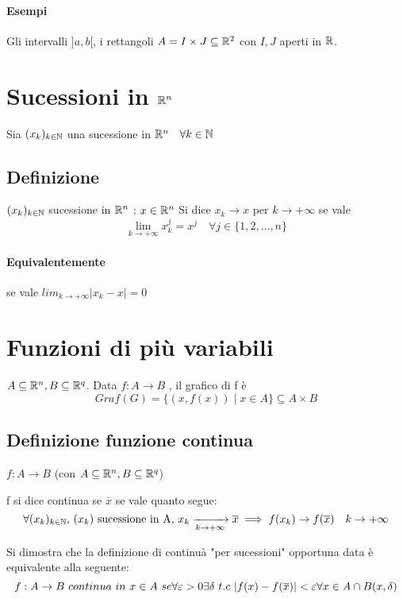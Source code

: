 \documentclass[a4paper]{article}
\begin{document}
\paragraph{Esempi} Gli intervalli $]a,b[$, i rettangoli $ A = I \times J \subseteq \mathbb{R} ^ 2 $ con $I,J$ aperti in $\mathbb{R}$. 

\section{ Sucessioni in $\mathbb{R} ^ n$}
Sia $ (x_k)_{k \in \mathbb{N}} $ una sucessione in $\mathbb{R} ^ n \quad \forall k \in \mathbb{N}$
\subsection {Definizione} 
$ (x_k)_{k \in \mathbb{N}} $ sucessione in $ \mathbb{R} ^ n$ ; $ x \in \mathbb{R} ^ n $
Si dice $ x_k \to x $ per $ k \to + \infty $ se vale 
$$
\lim_{k \to + \infty} x^j_k = x^j \quad \forall j \in \{ 1,2, \dots , n \}
$$
\paragraph {  Equivalentemente} se vale  $ lim_{k \to + \infty} | x_k -x | =0 $

\section{Funzioni di più variabili} 
$ A \subseteq \mathbb{R} ^ n, B \subseteq \mathbb{R} ^ q$. Data $ f: A \to B$ , il grafico di f è
$$
Graf(G)= \{ (x,f(x)) \mid x \in A \} \subseteq A \times B 
$$

\subsection { Definizione funzione continua} $f: A \to B$ (con $ A \subseteq \mathbb{R}^n , B \subseteq \mathbb{R} ^ q $)

f si dice continua se $ \overline x $ se vale quanto segue:
$$
\forall  (x_k)_{k \in \mathbb{N}} \mbox{, $(x_k)$ sucessione in A, } x_k \xrightarrow[k \to + \infty]{ } \overline x \\ 
\implies f( x_k ) \to f( \overline x ) \quad k \to + \infty
$$

Si dimostra che la definizione di continuà "per sucessioni" opportuna data è equivalente alla seguente:
$$ f: A \to B \ continua \ in \ x \in A \ se \\
\forall \varepsilon > 0 \exists \delta \ t.c\ |f(x)-f( \overline x ) | < \varepsilon \\
\forall x \in A \cap B (x, \delta) \\
$$
\end{document}
